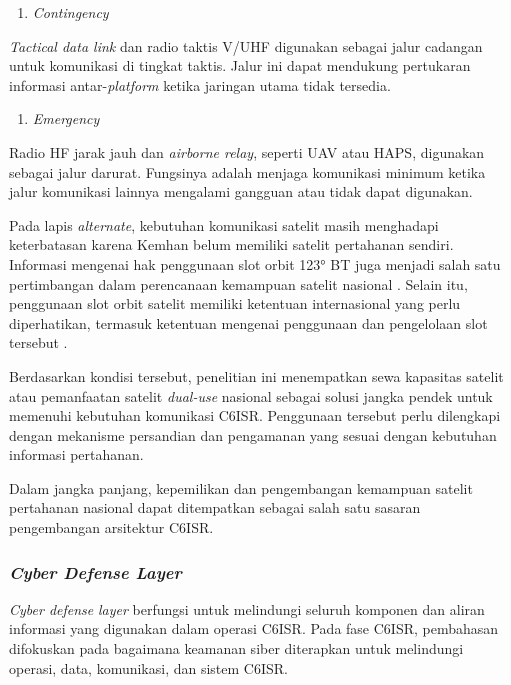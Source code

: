 \begin{enumerate}[start=3]
  \item \textit{Contingency}
\end{enumerate}
\textit{Tactical data link} dan radio taktis V/UHF digunakan sebagai jalur cadangan untuk komunikasi di tingkat taktis. Jalur ini dapat mendukung pertukaran informasi antar-\textit{platform} ketika jaringan utama tidak tersedia.

\begin{enumerate}[start=4]
  \item \textit{Emergency}
\end{enumerate}
Radio HF jarak jauh dan \textit{airborne relay}, seperti UAV atau HAPS, digunakan sebagai jalur darurat. Fungsinya adalah menjaga komunikasi minimum ketika jalur komunikasi lainnya mengalami gangguan atau tidak dapat digunakan.

Pada lapis \textit{alternate}, kebutuhan komunikasi satelit masih menghadapi keterbatasan karena Kemhan belum memiliki satelit pertahanan sendiri. Informasi mengenai hak penggunaan slot orbit 123° BT juga menjadi salah satu pertimbangan dalam perencanaan kemampuan satelit nasional \parencite{SuaraMerdeka2026}. Selain itu, penggunaan slot orbit satelit memiliki ketentuan internasional yang perlu diperhatikan, termasuk ketentuan mengenai penggunaan dan pengelolaan slot tersebut \parencite{KemhanAvanti2018}.

Berdasarkan kondisi tersebut, penelitian ini menempatkan sewa kapasitas satelit atau pemanfaatan satelit \textit{dual-use} nasional sebagai solusi jangka pendek untuk memenuhi kebutuhan komunikasi C6ISR. Penggunaan tersebut perlu dilengkapi dengan mekanisme persandian dan pengamanan yang sesuai dengan kebutuhan informasi pertahanan.

Dalam jangka panjang, kepemilikan dan pengembangan kemampuan satelit pertahanan nasional dapat ditempatkan sebagai salah satu sasaran pengembangan arsitektur C6ISR.

\subsubsection{\textit{Cyber Defense Layer}}

\textit{Cyber defense} \textit{layer} berfungsi untuk melindungi seluruh komponen dan aliran informasi yang digunakan dalam operasi C6ISR. Pada fase C6ISR, pembahasan difokuskan pada bagaimana keamanan siber diterapkan untuk melindungi operasi, data, komunikasi, dan sistem C6ISR.

